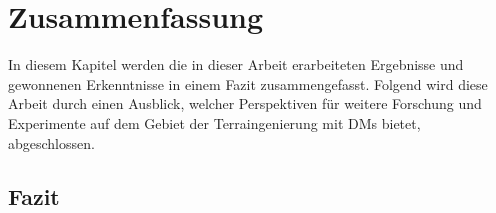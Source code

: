 \chapter{Zusammenfassung}

In diesem Kapitel werden die in dieser Arbeit erarbeiteten Ergebnisse und gewonnenen Erkenntnisse in einem Fazit zusammengefasst. Folgend wird diese Arbeit durch einen Ausblick, welcher Perspektiven für weitere Forschung und Experimente auf dem Gebiet der Terraingenierung mit DMs bietet, abgeschlossen.

\section{Fazit}

